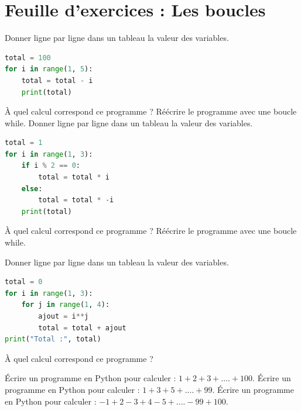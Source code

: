 \setcounter{Exercise}{0}

\chapter*{Feuille d'exercices : Les boucles}


\begin{Exercise}[title={Tableau d'exécution}]

    \Question Donner ligne par ligne dans un tableau la valeur des variables.
    \begin{lstlisting}[style=pythonstyle, language=Python]
total = 100
for i in range(1, 5):
    total = total - i
    print(total)\end{lstlisting}
    \Question À quel calcul correspond ce programme ?
    \Question Réécrire le programme avec une boucle while.
    \Question Donner ligne par ligne dans un tableau la valeur des variables.
    \begin{lstlisting}[style=pythonstyle, language=Python]
total = 1
for i in range(1, 3):
    if i % 2 == 0:
        total = total * i
    else:
        total = total * -i
    print(total)\end{lstlisting}
    \Question À quel calcul correspond ce programme ?
    \Question Réécrire le programme avec une boucle while.


    \Question Donner ligne par ligne dans un tableau la valeur des variables.
    \begin{lstlisting}[style=pythonstyle, language=Python]
total = 0
for i in range(1, 3):
    for j in range(1, 4):
        ajout = i**j
        total = total + ajout
print("Total :", total)\end{lstlisting}
    \Question À quel calcul correspond ce programme ?
\end{Exercise}



\newpage



\begin{Exercise}[title={Sommes}]
\Question Écrire un programme en Python pour calculer : $1+2+3+....+100$.
\Question Écrire un programme en Python pour calculer : $1+3+5+....+99$.
\Question Écrire un programme en Python pour calculer : $-1+2-3+4-5+....-99+100$.
\end{Exercise}